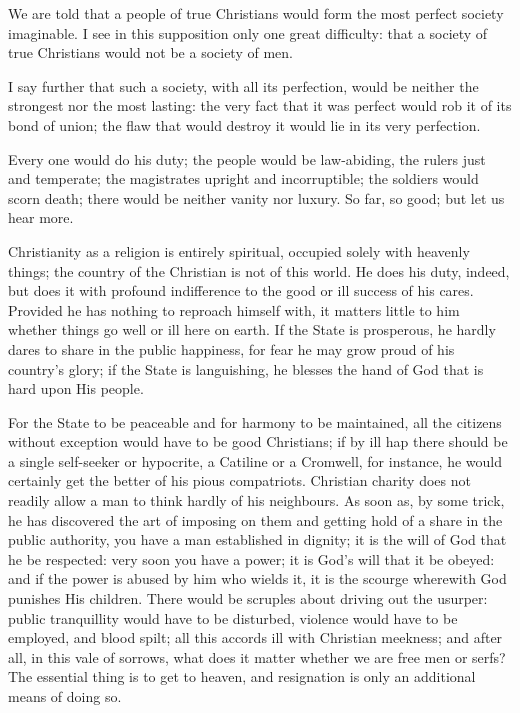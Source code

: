 \documentclass[12pt]{report}
\begin{document}
We are told that a people of true Christians would form the most perfect society imaginable. I see in this supposition only one great difficulty: that a society of true Christians would not be a society of men.

I say further that such a society, with all its perfection, would be neither the strongest nor the most lasting: the very fact that it was perfect would rob it of its bond of union; the flaw that would destroy it would lie in its very perfection.

Every one would do his duty; the people would be law-abiding, the rulers just and temperate; the magistrates upright and incorruptible; the soldiers would scorn death; there would be neither vanity nor luxury. So far, so good; but let us hear more.

Christianity as a religion is entirely spiritual, occupied solely with heavenly things; the country of the Christian is not of this world. He does his duty, indeed, but does it with profound indifference to the good or ill success of his cares. Provided he has nothing to reproach himself with, it matters little to him whether things go well or ill here on earth. If the State is prosperous, he hardly dares to share in the public happiness, for fear he may grow proud of his country's glory; if the State is languishing, he blesses the hand of God that is hard upon His people.

For the State to be peaceable and for harmony to be maintained, all the citizens without exception would have to be good Christians; if by ill hap there should be a single self-seeker or hypocrite, a Catiline or a Cromwell, for instance, he would certainly get the better of his pious compatriots. Christian charity does not readily allow a man to think hardly of his neighbours. As soon as, by some trick, he has discovered the art of imposing on them and getting hold of a share in the public authority, you have a man established in dignity; it is the will of God that he be respected: very soon you have a power; it is God's will that it be obeyed: and if the power is abused by him who wields it, it is the scourge wherewith God punishes His children. There would be scruples about driving out the usurper: public tranquillity would have to be disturbed, violence would have to be employed, and blood spilt; all this accords ill with Christian meekness; and after all, in this vale of sorrows, what does it matter whether we are free men or serfs? The essential thing is to get to heaven, and resignation is only an additional means of doing so.
\end{document}
